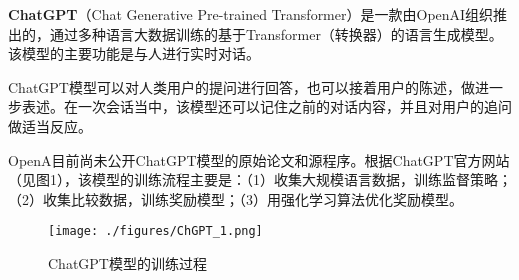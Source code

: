 
\textbf{ChatGPT}（Chat Generative Pre-trained Transformer）是一款由OpenAI组织推出的，通过多种语言大数据训练的基于Transformer（转换器）的语言生成模型。该模型的主要功能是与人进行实时对话。

ChatGPT模型可以对人类用户的提问进行回答，也可以接着用户的陈述，做进一步表述。在一次会话当中，该模型还可以记住之前的对话内容，并且对用户的追问做适当反应。

OpenA目前尚未公开ChatGPT模型的原始论文和源程序。根据ChatGPT官方网站（见图1），该模型的训练流程主要是：（1）收集大规模语言数据，训练监督策略；（2）收集比较数据，训练奖励模型；（3）用强化学习算法优化奖励模型。
\begin{figure}[ht]
\centering
\texttt{[image: ./figures/ChGPT\_1.png]}
\caption{ChatGPT模型的训练过程} \label{ChGPT_fig1}
\end{figure}

